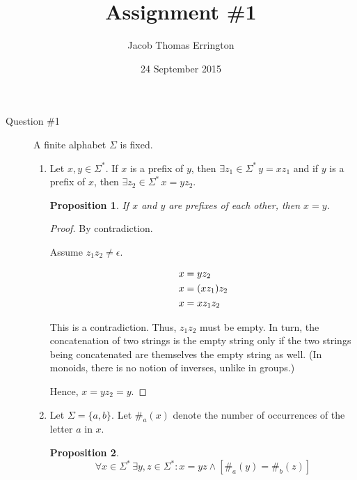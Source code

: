 \documentclass[letterpaper,11pt]{article}
\title{Assignment \#1}
\author{Jacob Thomas Errington}
\date{24 September 2015}
\newtheorem{proposition}{Proposition}
\begin{document}
\maketitle

\begin{description}
    \item[Question \#1] A finite alphabet $\Sigma$ is fixed.

        \begin{enumerate}
            \item Let $x,y\in\Sigma^*$. If $x$ is a prefix of $y$, then
                $\exists z_1 \in\Sigma^* \, y = xz_1$ and if $y$ is a prefix of
                $x$, then $\exists z_2\in\Sigma^* \, x = y z_2$.

                \begin{proposition}
                    If $x$ and $y$ are prefixes of each other, then $x = y$.
                \end{proposition}

                \begin{proof}
                    By contradiction.

                    Assume $z_1 z_2 \neq \epsilon$.

                    \begin{align}
                        x &= y z_2 \notag \\
                        x &= (xz_1) z_2 \notag \\
                        x &= x z_1 z_2
                        \label{eq:prefix_eachother}
                    \end{align}

                    This is a contradiction. Thus, $z_1 z_2$ must be empty. In
                    turn, the concatenation of two strings is the empty string
                    only if the two strings being concatenated are themselves
                    the empty string as well. (In monoids, there is no notion
                    of inverses, unlike in groups.)

                    Hence, $x = y z_2 = y$.
                \end{proof}

            \item Let $\Sigma = \{a,b\}$. Let $\#_a(x)$
                denote the number of occurrences of the letter
                $a$ in $x$.

                \begin{proposition}
                    $$
                    \forall x\in\Sigma^*\,
                    \exists y,z\in\Sigma^*:
                    x=yz\land[\#_a(y)=\#_b(z)]
                    $$


\end{proposition}
\end{enumerate}
\end{description}
\end{document}
